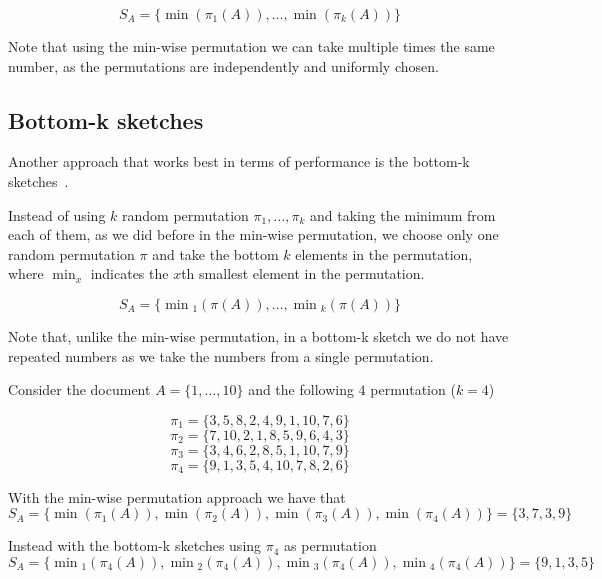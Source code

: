 \begin{equation}
S_{A} = \{ \min(\pi_{1}(A)), \ldots, \min(\pi_{k}(A)) \}
\end{equation}

\medskip

Note that using the min-wise permutation we can take multiple times the same number, as the permutations are independently and uniformly chosen.

\subsection*{Bottom-k sketches}

Another approach that works best in terms of performance is the bottom-k sketches~\cite{Cohen:2007:SDU:1281100.1281133}.\medskip

Instead of using $k$ random permutation $\pi_{1}, \ldots, \pi_{k}$ and taking the minimum from each of them,
as we did before in the min-wise permutation, we choose only one random permutation $\pi$ and take the bottom $k$ elements in the permutation, where $\min_{x}$ indicates the $x$th smallest element in the permutation.

\begin{equation}
S_{A} = \{ \min{\!}_{1}(\pi(A)), \ldots, \min{\!}_{k}(\pi(A)) \}
\end{equation}

\medskip

Note that, unlike the min-wise permutation, in a bottom-k sketch we do not have repeated numbers as we take the numbers from a single permutation.

\begin{esempio}
	Consider the document $A=\{1, \ldots, 10\}$ and the following $4$ permutation ($k = 4$)
	
	\begin{equation*}
	\pi_{1} = \{3, 5, 8, 2, 4, 9, 1, 10, 7, 6\}
	\end{equation*}
	\begin{equation*}
	\pi_{2} = \{7, 10, 2, 1, 8, 5, 9, 6, 4, 3\}
	\end{equation*}
	\begin{equation*}
	\pi_{3} = \{3, 4, 6, 2, 8, 5, 1, 10, 7, 9\}
	\end{equation*}
	\begin{equation*}
	\pi_{4} = \{9, 1, 3, 5, 4, 10, 7, 8, 2, 6\}
	\end{equation*}
	
	With the min-wise permutation approach we have that
	\begin{equation*}
	S_{A} = \{ \min(\pi_{1}(A)), \min(\pi_{2}(A)), \min(\pi_{3}(A)), \min(\pi_{4}(A)) \} = \{3, 7, 3, 9\}
	\end{equation*}
	
	Instead with the bottom-k sketches using $\pi_{4}$ as permutation
	\begin{equation*}
	S_{A} = \{ \min{\!}_{1}(\pi_{4}(A)), \min{\!}_{2}(\pi_{4}(A)), \min{\!}_{3}(\pi_{4}(A)), \min{\!}_{4}(\pi_{4}(A)) \} = \{9, 1, 3, 5\}
	\end{equation*}
	
\end{esempio}


